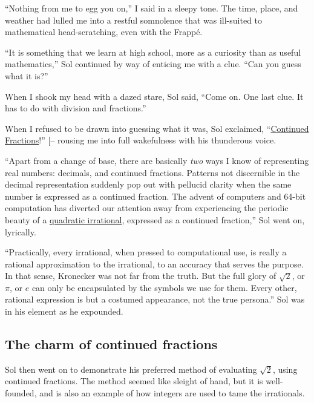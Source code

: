 \documentclass[
  a4paper,
]{article}
\begin{document}
``Nothing from me to egg you on,'' I said in a sleepy tone. The time,
place, and weather had lulled me into a restful somnolence that was
ill-suited to mathematical head-scratching, even with the Frappé.

``It is something that we learn at high school, more as a curiosity than
as useful mathematics,'' Sol continued by way of enticing me with a
clue. ``Can you guess what it is?''

When I shook my head with a dazed stare, Sol said, ``Come on. One last
clue. It has to do with division and fractions.''

When I refused to be drawn into guessing what it was, Sol exclaimed,
``\href{https://en.wikipedia.org/wiki/Continued_fraction}{Continued
Fractions}!''
{[}--\citeproc{ref-loya2017}{11}{]} rousing me
into full wakefulness with his thunderous voice.

``Apart from a change of base, there are basically \emph{two} ways I
know of representing real numbers: decimals, and continued fractions.
Patterns not discernible in the decimal representation suddenly pop out
with pellucid clarity when the same number is expressed as a continued
fraction. The advent of computers and 64-bit computation has diverted
our attention away from experiencing the periodic beauty of a
\href{https://en.wikipedia.org/wiki/Quadratic_irrational_number}{quadratic
irrational}, expressed as a continued fraction,'' Sol went on,
lyrically.

``Practically, every irrational, when pressed to computational use, is
really a rational approximation to the irrational, to an accuracy that
serves the purpose. In that sense, Kronecker was not far from the truth.
But the full glory of \(\sqrt{2}\), or \(\pi\), or \(e\) can only be
encapsulated by the symbols we use for them. Every other, rational
expression is but a costumed appearance, not the true persona.'' Sol was
in his element as he expounded.

\subsection{The charm of continued
fractions}\label{the-charm-of-continued-fractions}

Sol then went on to demonstrate his preferred method of evaluating
\(\sqrt{2}\), using continued fractions. The method seemed like sleight
of hand, but it is well-founded, and is also an example of how integers
are used to tame the irrationals.
\end{document}
